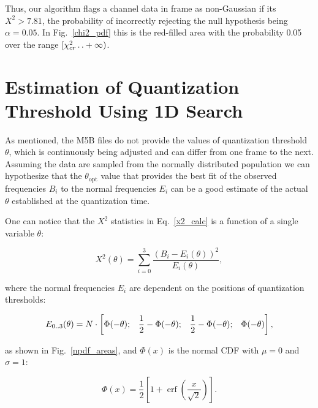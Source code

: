 \documentclass[letterpaper,twoside,12pt]{article}
\newcommand{\twodots}{\mathinner {\ldotp \ldotp}}
\DeclareMathOperator\erf{erf}
\begin{document}
Thus, our algorithm flags a channel data in frame as non-Gaussian if its $X^2 > 7.81$, the probability of incorrectly rejecting the null hypothesis being $\alpha = 0.05$. In Fig.~\ref{chi2_pdf} this is the red-filled area with the probability 0.05 over the range $[\chi^2_{cr} \twodots +\infty)$. 



\section{Estimation of Quantization Threshold Using 1D Search}

As mentioned, the M5B files do not provide the values of quantization threshold $\theta$, which is continuously being adjusted and can differ from one frame to the next. Assuming the data are sampled from the normally distributed population we can hypothesize that the $\theta_{\text{opt}}$ value that provides the best fit of the observed frequencies $B_i$ to the normal frequencies $E_i$ can be a good estimate of the actual $\theta$ established at the quantization time.

One can notice that the $X^2$ statistics in Eq.~\eqref{x2_calc} is a function of a single variable $\theta$: 

\begin{equation}
  \label{x2_func_of_theta}
  X^2(\theta) = \sum_{i=0}^3 \frac{(B_i - E_i(\theta))^2}{E_i(\theta)},
\end{equation}

\noindent where the normal frequencies $E_i$ are dependent on the positions of quantization thresholds:

\begin{equation*}
  \label{norm_freq}
  E_{0\twodots3}(\theta) = N \cdot \left[\Phi(-\theta); \; \; \; \frac{1}{2}-\Phi(-\theta);  \;\;\; 
                             \frac{1}{2}-\Phi(-\theta); \; \; \; \Phi(-\theta) \right],
\end{equation*}

\noindent as shown in Fig.~\ref{npdf_areas}, and $\Phi(x)$ is the normal CDF with $\mu=0$ and $\sigma=1$:

\begin{equation}
  \label{ncdf}
  \Phi(x) = \frac{1}{2} \left[1 + \erf \left( \frac{x}{\sqrt{2}} \right) \right].
\end{equation}
\end{document}
